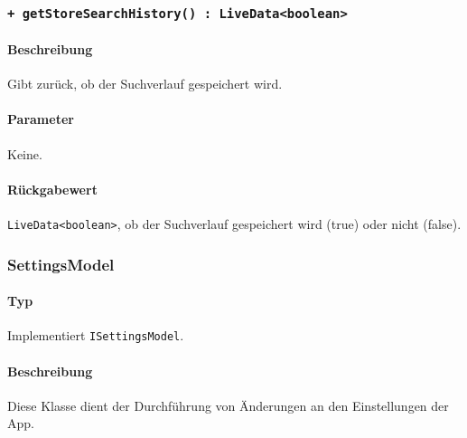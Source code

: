 \subsubsection*{\texttt{+ getStoreSearchHistory() : LiveData<boolean>}}\label{App_Settings_ISettingsModel_getStoreSearchHistory}%
\paragraph*{Beschreibung}
Gibt zurück, ob der Suchverlauf gespeichert wird.
\paragraph*{Parameter}
Keine.
\paragraph*{Rückgabewert}
\texttt{LiveData<boolean>}, ob der Suchverlauf gespeichert wird (true) oder nicht (false).

\subsubsection{SettingsModel}\label{App_Settings_SettingsModel}
\paragraph*{Typ}
Implementiert \texttt{ISettingsModel}.
\paragraph*{Beschreibung}
Diese Klasse dient der Durchführung von Änderungen an den Einstellungen der App.

